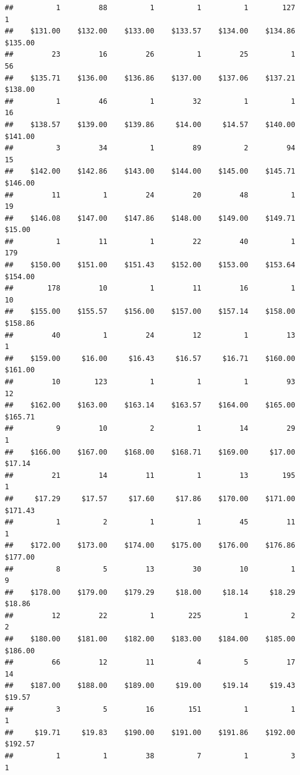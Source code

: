 \begin{verbatim}
##          1         88          1          1          1        127          1 
##    $131.00    $132.00    $133.00    $133.57    $134.00    $134.86    $135.00 
##         23         16         26          1         25          1         56 
##    $135.71    $136.00    $136.86    $137.00    $137.06    $137.21    $138.00 
##          1         46          1         32          1          1         16 
##    $138.57    $139.00    $139.86     $14.00     $14.57    $140.00    $141.00 
##          3         34          1         89          2         94         15 
##    $142.00    $142.86    $143.00    $144.00    $145.00    $145.71    $146.00 
##         11          1         24         20         48          1         19 
##    $146.08    $147.00    $147.86    $148.00    $149.00    $149.71     $15.00 
##          1         11          1         22         40          1        179 
##    $150.00    $151.00    $151.43    $152.00    $153.00    $153.64    $154.00 
##        178         10          1         11         16          1         10 
##    $155.00    $155.57    $156.00    $157.00    $157.14    $158.00    $158.86 
##         40          1         24         12          1         13          1 
##    $159.00     $16.00     $16.43     $16.57     $16.71    $160.00    $161.00 
##         10        123          1          1          1         93         12 
##    $162.00    $163.00    $163.14    $163.57    $164.00    $165.00    $165.71 
##          9         10          2          1         14         29          1 
##    $166.00    $167.00    $168.00    $168.71    $169.00     $17.00     $17.14 
##         21         14         11          1         13        195          1 
##     $17.29     $17.57     $17.60     $17.86    $170.00    $171.00    $171.43 
##          1          2          1          1         45         11          1 
##    $172.00    $173.00    $174.00    $175.00    $176.00    $176.86    $177.00 
##          8          5         13         30         10          1          9 
##    $178.00    $179.00    $179.29     $18.00     $18.14     $18.29     $18.86 
##         12         22          1        225          1          2          2 
##    $180.00    $181.00    $182.00    $183.00    $184.00    $185.00    $186.00 
##         66         12         11          4          5         17         14 
##    $187.00    $188.00    $189.00     $19.00     $19.14     $19.43     $19.57 
##          3          5         16        151          1          1          1 
##     $19.71     $19.83    $190.00    $191.00    $191.86    $192.00    $192.57 
##          1          1         38          7          1          3          1 

\end{verbatim}
